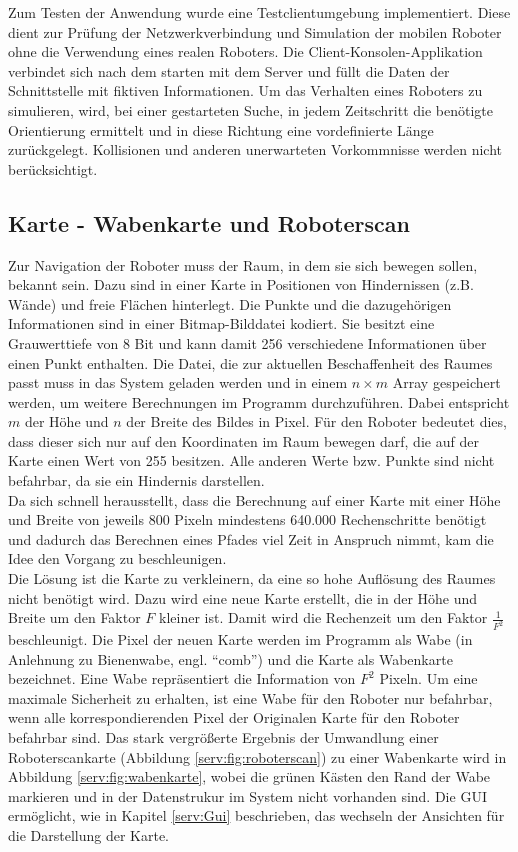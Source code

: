 Zum Testen der Anwendung wurde eine Testclientumgebung implementiert. Diese dient zur Prüfung der Netzwerkverbindung und Simulation der mobilen Roboter ohne die Verwendung eines realen Roboters. Die Client-Konsolen-Applikation verbindet sich nach dem starten mit dem Server und füllt die Daten der Schnittstelle mit fiktiven Informationen. Um das Verhalten eines Roboters zu simulieren, wird, bei einer gestarteten Suche, in jedem Zeitschritt die benötigte Orientierung ermittelt und in diese Richtung eine vordefinierte Länge zurückgelegt. Kollisionen und anderen unerwarteten Vorkommnisse werden nicht berücksichtigt.

\subsection{Karte - Wabenkarte und Roboterscan}\label{serv:maps}

Zur Navigation der Roboter muss der Raum, in dem sie sich bewegen sollen, bekannt sein. Dazu sind in einer Karte in Positionen von Hindernissen (z.B. Wände) und freie Flächen hinterlegt. Die Punkte und die dazugehörigen Informationen sind in einer Bitmap-Bilddatei kodiert. Sie besitzt eine Grauwerttiefe von 8 Bit und kann damit 256 verschiedene Informationen über einen Punkt enthalten. Die Datei, die zur aktuellen Beschaffenheit des Raumes passt muss in das System geladen werden und in einem $n\times m$ Array gespeichert werden, um weitere Berechnungen im Programm durchzuführen. Dabei entspricht $m$ der Höhe und $n$ der Breite des Bildes in Pixel. Für den Roboter bedeutet dies, dass dieser sich nur auf den Koordinaten im Raum bewegen darf, die auf der Karte einen Wert von 255 besitzen. Alle anderen Werte bzw. Punkte sind nicht befahrbar, da sie ein Hindernis darstellen. \\
Da sich schnell herausstellt, dass die Berechnung auf einer Karte mit einer Höhe und Breite von jeweils 800 Pixeln mindestens 640.000 Rechenschritte benötigt und dadurch das Berechnen eines Pfades viel Zeit in Anspruch nimmt, kam die Idee den Vorgang zu beschleunigen. \\
Die Lösung ist die Karte zu verkleinern, da eine so hohe Auflösung des Raumes nicht benötigt wird. Dazu wird eine neue Karte erstellt, die in der Höhe und Breite um den Faktor $F$ kleiner ist. Damit wird die Rechenzeit um den Faktor $\frac{1}{F^2}$ beschleunigt. Die Pixel der neuen Karte werden im Programm als Wabe (in Anlehnung zu Bienenwabe, engl. "`comb"') und die Karte als Wabenkarte bezeichnet. Eine Wabe repräsentiert die Information von $F^2$ Pixeln. Um eine maximale Sicherheit zu erhalten, ist eine Wabe für den Roboter nur befahrbar, wenn alle korrespondierenden Pixel der Originalen Karte für den Roboter befahrbar sind. Das stark vergrößerte Ergebnis der  Umwandlung einer Roboterscankarte (Abbildung \ref{serv:fig:roboterscan}) zu einer Wabenkarte wird in Abbildung \ref{serv:fig:wabenkarte}, wobei die grünen Kästen den Rand der Wabe markieren und in der Datenstrukur im System nicht vorhanden sind. Die GUI ermöglicht, wie in Kapitel \ref{serv:Gui} beschrieben, das wechseln der Ansichten für die Darstellung der Karte.

